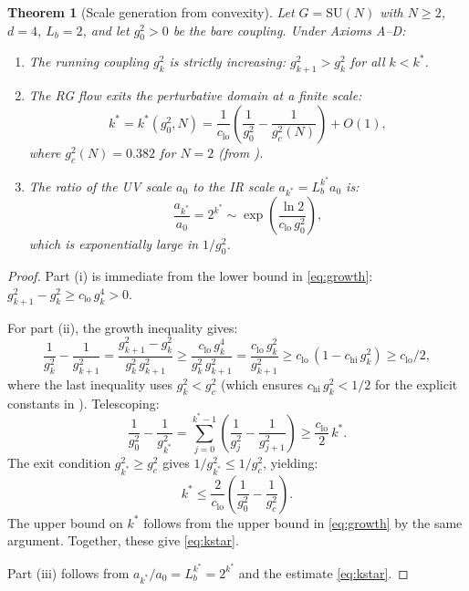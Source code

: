 \documentclass[12pt]{article}
\newtheorem{theorem}{Theorem}[section]
\theoremstyle{definition}
\theoremstyle{remark}
\newcommand{\SU}{\mathrm{SU}}
\newcommand{\gB}{g^2_c}
\begin{document}
\begin{theorem}[Scale generation from convexity]
\label{thm:scale_generation}
Let $G = \SU(N)$ with $N \ge 2$, $d = 4$, $L_b = 2$, and let
$g^2_0 > 0$ be the bare coupling. Under Axioms A--D:
\begin{enumerate}[label=(\roman*)]
\item The running coupling $g^2_k$ is strictly increasing:
  $g^2_{k+1} > g^2_k$ for all $k < k^*$.
\item The RG flow exits the perturbative domain at a finite scale:
\begin{equation}\label{eq:kstar}
k^* = k^*(g^2_0, N) = \frac{1}{c_{\mathrm{lo}}}\left(
  \frac{1}{g^2_0} - \frac{1}{\gB(N)}\right) + O(1),
\end{equation}
where $\gB(N) = 0.382$ for $N = 2$ (from \cite{Olbryk2026MG}).
\item The ratio of the UV scale $a_0$ to the IR scale
  $a_{k^*} = L_b^{k^*} a_0$ is:
\begin{equation}\label{eq:hierarchy}
\frac{a_{k^*}}{a_0} = 2^{k^*} \sim
\exp\!\left(\frac{\ln 2}{c_{\mathrm{lo}}\,g^2_0}\right),
\end{equation}
which is \emph{exponentially large} in $1/g^2_0$.
\end{enumerate}
\end{theorem}

\begin{proof}
Part (i) is immediate from the lower bound in \eqref{eq:growth}:
$g^2_{k+1} - g^2_k \ge c_{\mathrm{lo}}\,g^4_k > 0$.

For part (ii), the growth inequality gives:
\[
\frac{1}{g^2_k} - \frac{1}{g^2_{k+1}}
= \frac{g^2_{k+1} - g^2_k}{g^2_k\,g^2_{k+1}}
\ge \frac{c_{\mathrm{lo}}\,g^4_k}{g^2_k\,g^2_{k+1}}
= \frac{c_{\mathrm{lo}}\,g^2_k}{g^2_{k+1}}
\ge c_{\mathrm{lo}}\,(1 - c_{\mathrm{hi}}\,g^2_k)
\ge c_{\mathrm{lo}}/2,
\]
where the last inequality uses $g^2_k < \gB$ (which ensures
$c_{\mathrm{hi}}\,g^2_k < 1/2$ for the explicit constants in
\cite{Olbryk2026MG}).
Telescoping:
\[
\frac{1}{g^2_0} - \frac{1}{g^2_{k^*}}
= \sum_{j=0}^{k^*-1}\left(\frac{1}{g^2_j} - \frac{1}{g^2_{j+1}}\right)
\ge \frac{c_{\mathrm{lo}}}{2}\,k^*.
\]
The exit condition $g^2_{k^*} \ge \gB$ gives
$1/g^2_{k^*} \le 1/\gB$, yielding:
\[
k^* \le \frac{2}{c_{\mathrm{lo}}}\left(\frac{1}{g^2_0} - \frac{1}{\gB}\right).
\]
The upper bound on $k^*$ follows from the upper bound in
\eqref{eq:growth} by the same argument.  Together, these give
\eqref{eq:kstar}.

Part (iii) follows from $a_{k^*}/a_0 = L_b^{k^*} = 2^{k^*}$ and
the estimate \eqref{eq:kstar}.
\end{proof}
\end{document}

